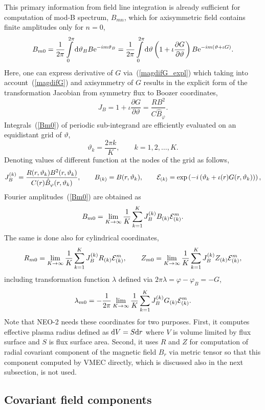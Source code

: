 \documentclass[12pt]{article}
\newcommand{\be}[1]{\begin{equation} \label{#1}}
\newcommand{\ee}{\end{equation}}
\newcommand{\eq}[1]{(\ref{#1})}
\newcommand{\difp}[2]{\frac{\partial #1}{\partial #2}}
\newcommand{\re}{{\rm e}}
\newcommand{\rd}{{\rm d}}
\newcommand{\cE}{{\cal E}}
\begin{document}
\noindent
This primary information from field line integration is already sufficient for computation of mod-B spectrum, $B_{mn}$, which for axisymmetric field
contains finite amplitudes only for $n=0$,
\be{Bm0}
B_{m0}=\frac{1}{2\pi}\int\limits_0^{2\pi} \rd\vartheta_B B \re^{-i m \vartheta_B}
=\frac{1}{2\pi}\int\limits_0^{2\pi} \rd\vartheta \left(1+\iota \difp{G}{\vartheta}\right) B \re^{-i m \left(\vartheta+\iota G\right)}.
\ee
Here, one can express derivative of $G$ via~\eq{magdifG_expl} which taking into account~\eq{magdifG} and axisymmetry of $G$ results in
the explicit form of the transformation Jacobian from symmetry flux to Boozer coordinates,
\be{transfactor}
J_B=1+\iota \difp{G}{\vartheta}=\frac{R B^2}{C \hat B_\varphi}.
\ee
Integrals~\eq{Bm0} of periodic sub-integrand are efficiently evaluated on an equidistant grid of $\vartheta$,
\be{thetak}
\vartheta_k = \frac{2\pi k}{K}, \qquad k=1,2,\dots,K.
\ee
Denoting values of different function at the nodes of the grid as follows,
\be{fnodes}
J_B^{(k)} = \frac{R(r,\vartheta_k) B^2(r,\vartheta_k)}{C(r)\hat B_\varphi(r,\vartheta_k)},
\qquad
B_{(k)} = B(r,\vartheta_k),
\qquad
\cE_{(k)} = \exp\left(- i \left(\vartheta_k + \iota(r)G(r,\vartheta_k)\right)\right),
\ee
Fourier amplitudes~\eq{Bm0} are obtained as
\be{Bm0num}
B_{m0}=\lim_{K\rightarrow\infty}\frac{1}{K}\sum\limits_{k=1}^K J_B^{(k)} B_{(k)} \cE_{(k)}^m.
\ee
The same is done also for cylindrical coordinates,
\be{RZ0num}
R_{m0}=\lim_{K\rightarrow\infty}\frac{1}{K}\sum\limits_{k=1}^K J_B^{(k)} R_{(k)} \cE_{(k)}^m,
\qquad
Z_{m0}=\lim_{K\rightarrow\infty}\frac{1}{K}\sum\limits_{k=1}^K J_B^{(k)} Z_{(k)} \cE_{(k)}^m,
\ee
including transformation function $\lambda$ defined via $2\pi\lambda=\varphi-\varphi_B=-G$,
\be{lam0m}
\lambda_{m0}= - \frac{1}{2\pi}\lim_{K\rightarrow\infty}\frac{1}{K}\sum\limits_{k=1}^K J_B^{(k)} G_{(k)} \cE_{(k)}^m.
\ee
Note that NEO-2 needs these coordinates for two purposes. First, it computes effective plasma radius defined
as $\rd V= S \rd r$ where $V$ is volume limited by flux surface and $S$ is flux surface area. Second, it
uses $R$ and $Z$ for computation of radial covariant component of the magnetic field $B_r$ via metric tensor
so that this component computed by VMEC directly, which is discussed also in the next subsection, is not used.

\subsection{Covariant field components}
\label{ssec:covar}
\end{document}
